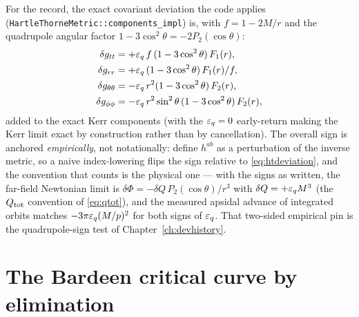 For the record, the exact covariant deviation the code applies
(\texttt{HartleThorneMetric::components\_impl}) is, with
$f = 1 - 2M/r$ and the quadrupole angular factor
$1 - 3\cos^2\theta = -2P_2(\cos\theta)$:
\begin{align}
\delta g_{tt} &= +\varepsilon_q\, f\,(1 - 3\cos^2\theta)\,F_1(r),
\nonumber\\
\delta g_{rr} &= +\varepsilon_q\,(1 - 3\cos^2\theta)\,F_1(r)/f,
\nonumber\\
\delta g_{\theta\theta} &= -\varepsilon_q\, r^2 (1 - 3\cos^2\theta)\,F_2(r),
\nonumber\\
\delta g_{\phi\phi} &= -\varepsilon_q\, r^2\sin^2\theta\,
(1 - 3\cos^2\theta)\,F_2(r),
\label{eq:htdeviation}
\end{align}
added to the exact Kerr components (with the $\varepsilon_q = 0$ early-return
making the Kerr limit exact by construction rather than by
cancellation). The overall sign is anchored \emph{empirically}, not
notationally: \citet{GlampedakisBabak2006} define $h^{ab}$ as a
perturbation of the inverse metric, so a naive index-lowering flips
the sign relative to \eqref{eq:htdeviation}, and the convention that
counts is the physical one — with the signs as written, the far-field
Newtonian limit is $\delta\Phi = -\delta Q\,P_2(\cos\theta)/r^3$ with
$\delta Q = +\varepsilon_q M^3$ (the $Q_{\rm tot}$ convention of
\eqref{eq:qtot}), and the measured apsidal advance of integrated
orbits matches $-3\pi\varepsilon_q(M/p)^2$ for both signs of $\varepsilon_q$. That
two-sided empirical pin is the quadrupole-sign test of
Chapter~\ref{ch:devhistory}.

\section{The Bardeen critical curve by elimination}
\label{app:bardeen}

